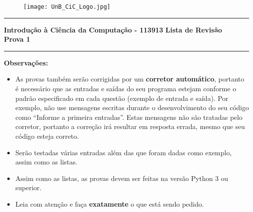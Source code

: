 \documentclass[a4paper, 12pt]{article}
\begin{document}
\begin{figure}[H]
	\texttt{[image: UnB\_CiC\_Logo.jpg]}
\end{figure}
\noindent\rule{\textwidth}{0.4pt}
\begin{center}
	\textbf{{\Large Introdução à Ciência da Computação - 113913}} \newline \newline
	\textbf{{\large Lista de Revisão} \\
	\vspace{9pt}
	{\large Prova 1}} \\
	\noindent\rule{\textwidth}{0.4pt}
	\newline
\end{center}

\textbf{{\large Observações:}}
\begin{itemize}
	\item As provas também serão corrigidas por um \textbf{corretor automático}, portanto é necessário que as entradas e saídas do seu programa estejam conforme o padrão especificado em cada questão (exemplo de entrada e saída). Por exemplo, não use mensagens escritas durante o desenvolvimento do seu código como ``Informe a primeira entradas''. Estas mensagens não são tratadas pelo corretor, portanto a correção irá resultar em resposta errada, mesmo que seu código esteja correto.
	\item Serão testadas várias entradas além das que foram dadas como exemplo, assim como as listas.
	\item Assim como as listas, as provas devem ser feitas na versão Python 3 ou superior.
	\item Leia com atenção e faça \textbf{exatamente} o que está sendo pedido.
\end{itemize}
\end{document}
